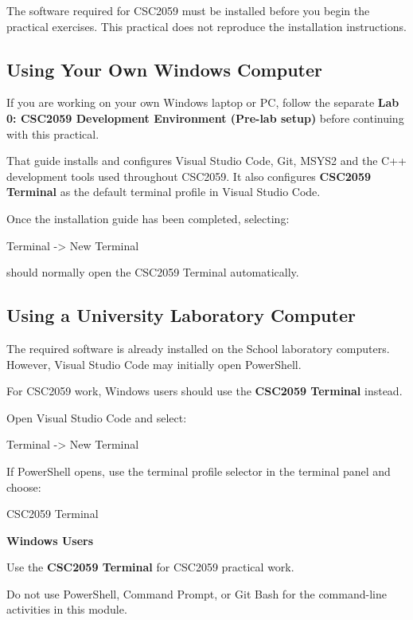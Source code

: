\documentclass{csc2059practical}
\begin{document}
The software required for CSC2059 must be installed before you begin the practical exercises. This practical does not reproduce the installation instructions.

\subsection{Using Your Own Windows Computer}

If you are working on your own Windows laptop or PC, follow the separate \textbf{Lab 0: CSC2059 Development Environment (Pre-lab setup)} before continuing with this practical.

That guide installs and configures Visual Studio Code, Git, MSYS2 and the C++ development tools used throughout CSC2059. It also configures \textbf{CSC2059 Terminal} as the default terminal profile in Visual Studio Code.

Once the installation guide has been completed, selecting:

\begin{terminalplain}
Terminal -> New Terminal
\end{terminalplain}

should normally open the CSC2059 Terminal automatically.

\subsection{Using a University Laboratory Computer}

The required software is already installed on the School laboratory computers. However, Visual Studio Code may initially open PowerShell.

For CSC2059 work, Windows users should use the \textbf{CSC2059 Terminal} instead.

Open Visual Studio Code and select:

\begin{terminalplain}
Terminal -> New Terminal
\end{terminalplain}

If PowerShell opens, use the terminal profile selector in the terminal panel and choose:

\begin{terminalplain}
CSC2059 Terminal
\end{terminalplain}

\clearpage

\begin{importantnote}
\textbf{Windows Users}\par
\medskip

Use the \textbf{CSC2059 Terminal} for CSC2059 practical work.

Do not use PowerShell, Command Prompt, or Git Bash for the command-line activities in this module.
\end{importantnote}
\end{document}
